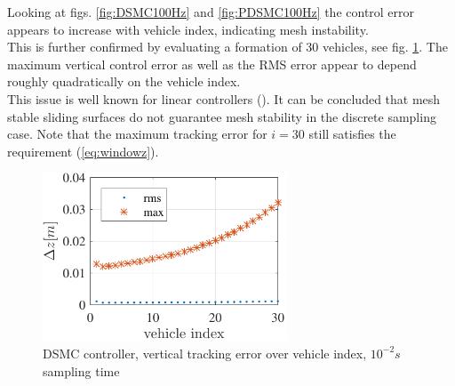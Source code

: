 \documentclass{ifacconf}
\newcommand{\idxFollower}{{\ensuremath{i} }}
\begin{document}
Looking at figs.  \ref{fig:DSMC100Hz} and \ref{fig:PDSMC100Hz} the control error appears to increase with vehicle index, indicating mesh instability.\\
This is further confirmed by evaluating a formation of 30 vehicles, see fig. \ref{fig:errroamplification}. The maximum vertical control error as well as the RMS  error appear to depend roughly quadratically on the vehicle index.\\
This issue is well known for linear controllers (\cite{Pant2002}). It can be concluded that mesh stable sliding surfaces do not guarantee mesh stability in the discrete sampling case.
Note that the maximum tracking error for $\idxFollower = 30$ still satisfies the requirement (\ref{eq:windowz}).
\begin{figure}[h!]
\begin{center}
\includegraphics[width=\columnwidth,height=5cm]{erroramplification-DSMC-100Hz-TIMESCALESEPARATION-turbulence=1-turbulenceonlyfirstUAS}    %
\caption{ DSMC controller, vertical tracking error over vehicle index, $10^{-2} s$ sampling time}
\label{fig:errroamplification}
\end{center}
\end{figure}
\end{document}
